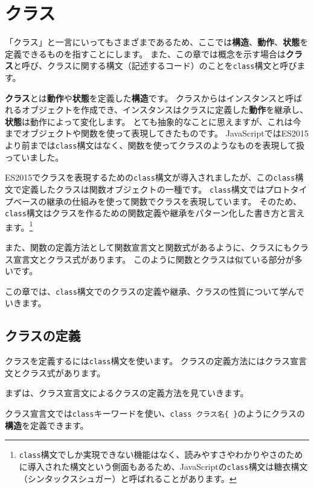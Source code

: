 \hypertarget{class}{%
\chapter{クラス}\label{class}}

「クラス」と一言にいってもさまざまであるため、ここでは\textbf{構造}、\textbf{動作}、\textbf{状態}を定義できるものを指すことにします。
また、この章では概念を示す場合は\textbf{クラス}と呼び、クラスに関する構文（記述するコード）のことを\texttt{class}構文と呼びます。

\textbf{クラス}とは\textbf{動作}や\textbf{状態}を定義した\textbf{構造}です。
クラスからはインスタンスと呼ばれるオブジェクトを作成でき、インスタンスはクラスに定義した\textbf{動作}を継承し、\textbf{状態}は動作によって変化します。
とても抽象的なことに思えますが、これは今までオブジェクトや関数を使って表現してきたものです。
JavaScriptではES2015より前までは\texttt{class}構文はなく、関数を使ってクラスのようなものを表現して扱っていました。

ES2015でクラスを表現するための\texttt{class}構文が導入されましたが、この\texttt{class}構文で定義したクラスは関数オブジェクトの一種です。
\texttt{class}構文ではプロトタイプベースの継承の仕組みを使って関数でクラスを表現しています。
そのため、\texttt{class}構文はクラスを作るための関数定義や継承をパターン化した書き方と言えます。\footnote{\texttt{class}構文でしか実現できない機能はなく、読みやすさやわかりやさのために導入された構文という側面もあるため、JavaScriptの\texttt{class}構文は糖衣構文（シンタックスシュガー）と呼ばれることがあります。}

また、関数の定義方法として関数宣言文と関数式があるように、クラスにもクラス宣言文とクラス式があります。
このように関数とクラスは似ている部分が多いです。

この章では、\texttt{class}構文でのクラスの定義や継承、クラスの性質について学んでいきます。

\hypertarget{class-declaration}{%
\section{クラスの定義}\label{class-declaration}}

クラスを定義するには\texttt{class}構文を使います。
クラスの定義方法にはクラス宣言文とクラス式があります。

まずは、クラス宣言文によるクラスの定義方法を見ていきます。

クラス宣言文では\texttt{class}キーワードを使い、\texttt{class クラス名\{ \}}のようにクラスの\textbf{構造}を定義できます。

